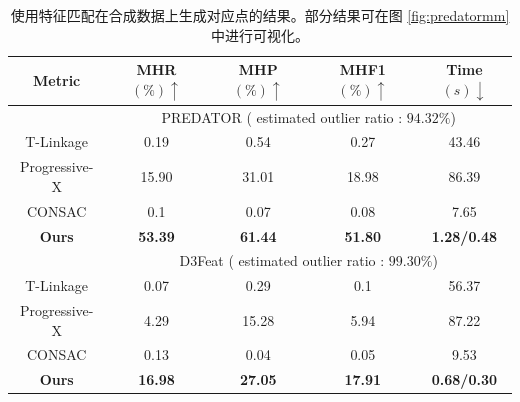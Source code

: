 \begin{table}[ht]
    \scriptsize
        \centering
            \begin{tabular}{ccccc} 
                \toprule
                \textbf{Metric}& MHR$\left( \% \right) \uparrow $& MHP$\left( \% \right) \uparrow $& MHF1$\left( \% \right) \uparrow $ & Time$\left( s \right) \downarrow $\\
                \hline
                & \multicolumn{4}{c}{PREDATOR ( estimated outlier ratio : $94.32\%$)} \\
                \hline
                T-Linkage & 0.19 & 0.54 & 0.27 & 43.46 \\
                Progressive-X & 15.90 & 31.01 & 18.98 & 86.39 \\
                CONSAC & 0.1 & 0.07 & 0.08 & 7.65 \\
                \textbf{Ours} &\textbf{53.39} & \textbf{61.44} & \textbf{51.80} & \textbf{1.28/0.48} \\
                \hline
                
                &\multicolumn{4}{c}{D3Feat ( estimated outlier ratio : $99.30\%$)} \\
                \hline
                T-Linkage & 0.07 & 0.29 & 0.1 & 56.37  \\
                Progressive-X & 4.29 & 15.28 & 5.94 & 87.22 \\
                CONSAC & 0.13 & 0.04 & 0.05 & 9.53 \\
                \textbf{Ours} & \textbf{16.98} & \textbf{27.05} & \textbf{17.91} & \textbf{0.68/0.30} \\
                \bottomrule
        \end{tabular}
        \caption{使用特征匹配在合成数据上生成对应点的结果。部分结果可在图 \ref{fig:predatormm} 中进行可视化。}
        \label{tab:realcorr}
        \end{table}
    
